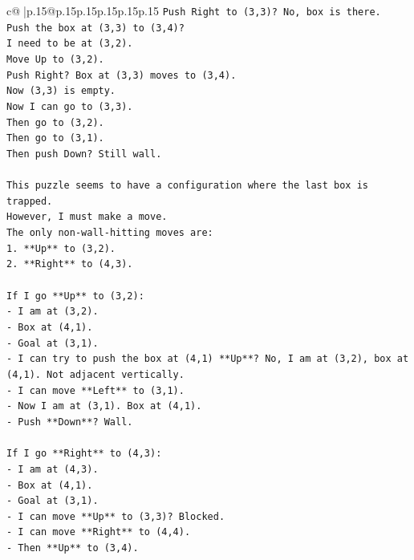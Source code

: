 \documentclass{article}
\begin{document}
{\begin{supertabular}{c@{$\;$}|p{.15\linewidth}@{}p{.15\linewidth}p{.15\linewidth}p{.15\linewidth}p{.15\linewidth}p{.15\linewidth}}
{{{\texttt{Push Right to (3,3)? No, box is there.} \\
\texttt{Push the box at (3,3) to (3,4)?} \\
\texttt{I need to be at (3,2).} \\
\texttt{Move Up to (3,2).} \\
\texttt{Push Right? Box at (3,3) moves to (3,4).} \\
\texttt{Now (3,3) is empty.} \\
\texttt{Now I can go to (3,3).} \\
\texttt{Then go to (3,2).} \\
\texttt{Then go to (3,1).} \\
\texttt{Then push Down? Still wall.} \\
\\ 
\texttt{This puzzle seems to have a configuration where the last box is trapped.} \\
\texttt{However, I must make a move.} \\
\texttt{The only non{-}wall{-}hitting moves are:} \\
\texttt{1. **Up** to (3,2).} \\
\texttt{2. **Right** to (4,3).} \\
\\ 
\texttt{If I go **Up** to (3,2):} \\
\texttt{{-} I am at (3,2).} \\
\texttt{{-} Box at (4,1).} \\
\texttt{{-} Goal at (3,1).} \\
\texttt{{-} I can try to push the box at (4,1) **Up**? No, I am at (3,2), box at (4,1). Not adjacent vertically.} \\
\texttt{{-} I can move **Left** to (3,1).} \\
\texttt{{-} Now I am at (3,1). Box at (4,1).} \\
\texttt{{-} Push **Down**? Wall.} \\
\\ 
\texttt{If I go **Right** to (4,3):} \\
\texttt{{-} I am at (4,3).} \\
\texttt{{-} Box at (4,1).} \\
\texttt{{-} Goal at (3,1).} \\
\texttt{{-} I can move **Up** to (3,3)? Blocked.} \\
\texttt{{-} I can move **Right** to (4,4).} \\
\texttt{{-} Then **Up** to (3,4).} \\
}}}
\end{supertabular}}
\end{document}
